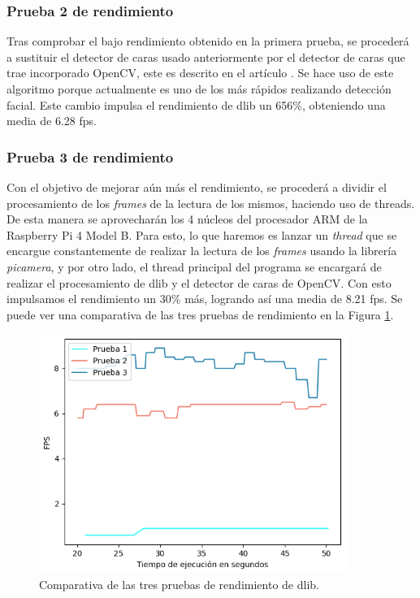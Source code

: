 \subsubsection{Prueba 2 de rendimiento}

Tras comprobar el bajo rendimiento obtenido en la primera prueba, se procederá a sustituir el detector de caras usado anteriormente por el detector de caras que trae incorporado OpenCV, este es descrito en el artículo \cite{opencv_haar_cascade}. Se hace uso de este algoritmo porque actualmente es uno de los más rápidos realizando detección facial. Este cambio impulsa el rendimiento de dlib un 656\%, obteniendo una media de 6.28 fps.

\subsubsection{Prueba 3 de rendimiento}
Con el objetivo de mejorar aún más el rendimiento, se procederá a dividir el procesamiento de los \textit{frames} de la lectura de los mismos, haciendo uso de threads. De esta manera se aprovecharán los 4 núcleos del procesador ARM de la Raspberry Pi 4 Model B. Para esto, lo que haremos es lanzar un \textit{thread} que se encargue constantemente de realizar la lectura de los \textit{frames} usando la librería \textit{picamera}, y por otro lado, el thread principal del programa se encargará de realizar el procesamiento de dlib y el detector de caras de OpenCV. Con esto impulsamos el rendimiento un 30\% más, logrando así una media de 8.21 fps. Se puede ver una comparativa de las tres pruebas de rendimiento en la Figura \ref{fig:dlib_rendimiento}.

\begin{figure} [h!]
  \begin{center}
    \includegraphics[width=10cm]{figs/dlib_rendimiento.png}
  \end{center}
  \captionsetup{justification=centering}
  \caption{Comparativa de las tres pruebas de rendimiento de dlib.}
  \label{fig:dlib_rendimiento}
\end{figure}

